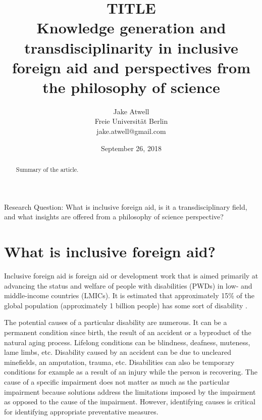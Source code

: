 \documentclass[a4paper]{article}
\begin{document}
\title{TITLE\\
Knowledge generation and transdisciplinarity in inclusive foreign aid and perspectives from the
philosophy of science}
\author{Jake Atwell\\Freie Universität Berlin\\jake.atwell@gmail.com}
\date{September 26, 2018}

\maketitle



\begin{abstract}
Summary of the article.
\end{abstract}
\newpage

\noindent Research Question: What is inclusive foreign aid, is it a
transdisciplinary field, and what insights are offered from a philosophy of
science perspective?

\tableofcontents

\newpage
{} %




\section{What is inclusive foreign aid?}

Inclusive foreign aid is foreign aid or development work that is aimed
primarily at advancing the status and welfare of people with disabilities
(PWDs) in low- and middle-income countries (LMICs). It is estimated that
approximately 15\% of the global population (approximately 1 billion people)
has some sort of disability \citep{banks2017poverty}.

The potential causes of a particular disability are numerous. It can be a
permanent condition since birth, the result of an accident or a byproduct of
the natural aging process. Lifelong conditions can be blindness, deafness,
muteness, lame limbs, etc. Disability caused by an accident can be due to
uncleared minefields, an amputation, trauma, etc. Disabilities can also be
temporary conditions for example as a result of an injury while the person is
recovering. The cause of a specific impairment does not matter as much as the
particular impairment because solutions address the limitations imposed by the
impairment as opposed to the cause of the impairment. However, identifying
causes is critical for identifying appropriate preventative measures.
\end{document}

